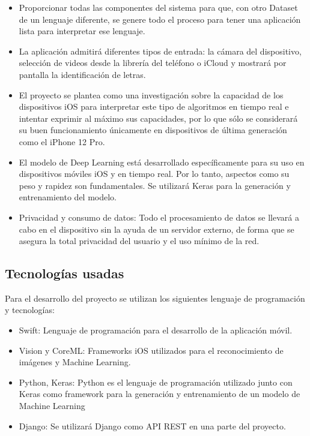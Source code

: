 \documentclass[../main.tex]{subfiles}
\begin{document}
\begin{itemize}
    \item Proporcionar todas las componentes del sistema para que, con otro Dataset de un lenguaje diferente, se genere todo el proceso para tener una aplicación lista para interpretar ese lenguaje.
    \item La aplicación admitirá diferentes tipos de entrada: la cámara del dispositivo, selección de videos desde la librería del teléfono o iCloud y mostrará por pantalla la identificación de letras. 
    \item El proyecto se plantea como una investigación sobre la capacidad de los dispositivos iOS para interpretar este tipo de algoritmos en tiempo real e intentar exprimir al máximo sus capacidades, por lo que sólo se considerará su buen funcionamiento únicamente en dispositivos de última generación como el iPhone 12 Pro.
    \item El modelo de Deep Learning está desarrollado específicamente  para su uso en dispositivos móviles iOS y en tiempo real. Por lo tanto, aspectos como su peso y rapidez son fundamentales. Se utilizará Keras para la generación y entrenamiento del modelo.
    \item Privacidad y consumo de datos: Todo el procesamiento de datos se llevará a cabo en el dispositivo sin la ayuda de un servidor externo, de forma que se asegura la total privacidad del usuario y el uso mínimo de la red.
\end{itemize}

\newpage

\subsection{Tecnologías usadas}
Para el desarrollo del proyecto se utilizan los siguientes lenguaje de programación y tecnologías:
\begin{itemize}
    \item Swift: Lenguaje de programación para el desarrollo de la aplicación móvil. 
    \item Vision y CoreML: Frameworks iOS utilizados para el reconocimiento de imágenes y Machine Learning.
    \item Python, Keras: Python es el lenguaje de programación utilizado junto con Keras como framework para la generación y entrenamiento de un modelo de Machine Learning
    \item Django: Se utilizará Django como API REST en una parte del proyecto.
\end{itemize}
\end{document}
